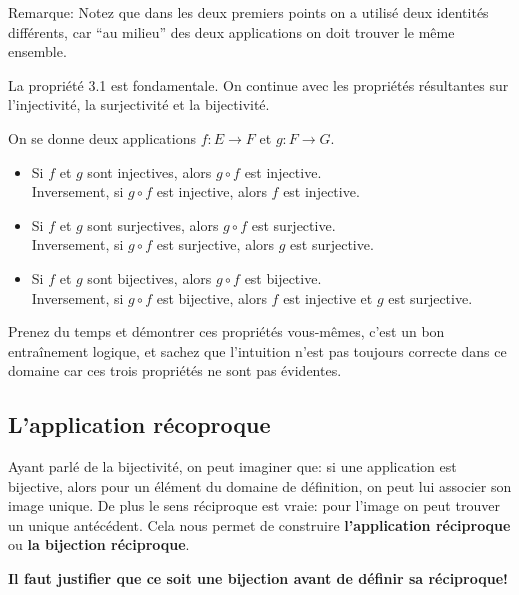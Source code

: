 \documentclass{article}
\begin{document}
Remarque: Notez que dans les deux premiers points on a utilisé deux identités différents, car ``au milieu'' des deux applications on doit trouver le même ensemble.

La propriété 3.1 est fondamentale. On continue avec les propriétés résultantes sur l'injectivité, la surjectivité et la bijectivité.


\begin{tcolorbox}[colback=blue!5!white,colframe=blue!75!black,title=Propriété 3.2]

On se donne deux applications $f : E \to F$ et $g : F \to G$.

\begin{itemize}
    \item Si $f$ et $g$ sont injectives, alors $g \circ f$ est injective. \\
    Inversement, si $g \circ f$ est injective, alors $f$ est injective.

    \item Si $f$ et $g$ sont surjectives, alors $g \circ f$ est surjective. \\
    Inversement, si $g \circ f$ est surjective, alors $g$ est surjective.

    \item Si $f$ et $g$ sont bijectives, alors $g \circ f$ est bijective. \\
    Inversement, si $g \circ f$ est bijective, alors $f$ est injective et $g$ est surjective.
\end{itemize}

\end{tcolorbox} 

Prenez du temps et démontrer ces propriétés vous-mêmes, c'est un bon entraînement logique, et sachez que l'intuition n'est pas toujours correcte dans ce domaine car ces trois propriétés ne sont pas évidentes.

\subsection{L'application récoproque}

Ayant parlé de la bijectivité, on peut imaginer que: si une application est bijective, alors pour un élément du domaine de définition, on peut lui associer son image unique. De plus le sens réciproque est vraie: pour l'image on peut trouver un unique antécédent. Cela nous permet de construire \textbf{l'application réciproque} ou \textbf{la bijection réciproque}.

\textbf{Il faut justifier que ce soit une bijection avant de définir sa réciproque!}
\end{document}

